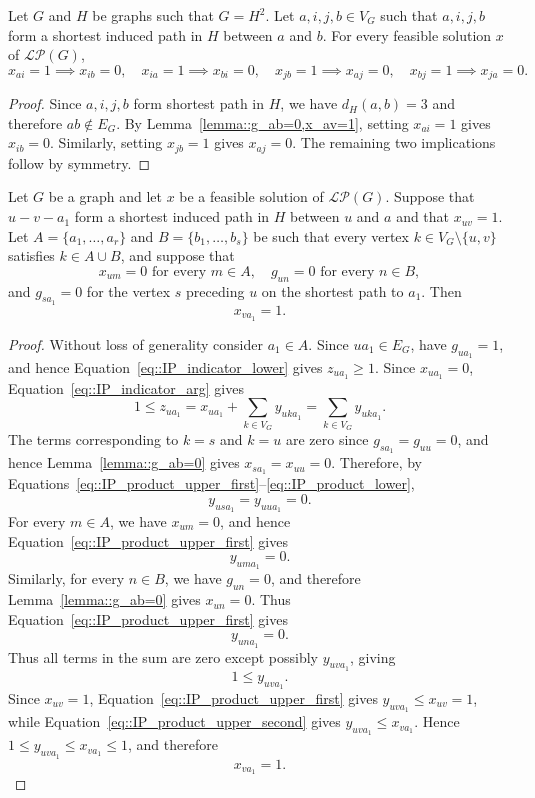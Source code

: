 \begin{lemma} \label{lemma::0_path_propagation}
  Let $G$ and $H$ be graphs such that $G = H^2$. Let $a,i,j,b \in V_G$ such that $a,i,j,b$ form a shortest induced path in $H$ between $a$ and $b$. For every feasible solution $x$ of $\mathcal{LP}(G)$,
  \[
  x_{ai}=1 \implies x_{ib}=0, \quad x_{ia}=1 \implies x_{bi}=0, \quad x_{jb}=1 \implies x_{aj}=0, \quad x_{bj}=1 \implies x_{ja}=0.
  \]
\end{lemma}
\begin{proof}
  Since $a,i,j,b$ form shortest path in $H$, we have $d_H(a,b)=3$ and therefore $ab \notin E_G$. By Lemma~\eqref{lemma::g_ab=0,x_av=1}, setting  $x_{ai}=1$ gives $x_{ib}=0.$ Similarly, setting $x_{jb}=1$ gives $ x_{aj}=0$. The remaining two implications follow by symmetry.
\end{proof}

\begin{lemma} \label{lemma::1_path_propagation}
  Let $G$ be a graph and let $x$ be a feasible solution of $\mathcal{LP}(G)$. Suppose that $u-v-a_1$ form a shortest induced path in $H$ between $u$ and $a$ and that $x_{uv}=1$. Let $A=\{a_1,\ldots,a_r\}$ and $B=\{b_1,\ldots,b_s\}$ be such that every vertex $k \in V_G\setminus\{u,v\}$ satisfies
  $k \in A\cup B$, and suppose that 
  \[
  x_{um}=0 \text{ for every } m \in A, \quad g_{un}=0 \text{ for every } n \in B,
  \]
  and $g_{sa_1}=0$ for the vertex $s$ preceding $u$ on the shortest path to $a_1$. Then
  \[
  x_{va_1}=1.
  \]
\end{lemma}
\begin{proof}
  Without loss of generality consider $a_1\in A$. Since $ua_1\in E_G$, have $g_{ua_1}=1$, and hence Equation~\eqref{eq::IP_indicator_lower} gives $z_{ua_1}\geq1$. Since $x_{ua_1}=0$, Equation~\eqref{eq::IP_indicator_arg} gives
  \[
  1 \leq z_{ua_1} = x_{ua_1}+\sum_{k\in V_G}y_{uka_1} = \sum_{k\in V_G}y_{uka_1}.
  \]
  The terms corresponding to $k=s$ and $k=u$ are zero since $g_{sa_1}=g_{uu}=0$, and hence Lemma~\eqref{lemma::g_ab=0} gives $x_{sa_1}=x_{uu}=0$. Therefore, by Equations~\eqref{eq::IP_product_upper_first}--\eqref{eq::IP_product_lower},
  \[
  y_{usa_1}=y_{uua_1}=0.
  \]
  For every $m\in A$, we have $x_{um}=0$, and hence Equation~\eqref{eq::IP_product_upper_first} gives
  \[
  y_{uma_1}=0.
  \]
  Similarly, for every $n\in B$, we have $g_{un}=0$, and therefore Lemma~\eqref{lemma::g_ab=0} gives $x_{un}=0$. Thus Equation~\eqref{eq::IP_product_upper_first} gives
  \[
  y_{una_1}=0.
  \]
  Thus all terms in the sum are zero except possibly $y_{uva_1}$, giving
  \[
  1 \leq y_{uva_1}.
  \]
  Since $x_{uv}=1$, Equation~\eqref{eq::IP_product_upper_first} gives $y_{uva_1}\leq x_{uv}=1$, while Equation~\eqref{eq::IP_product_upper_second} gives $y_{uva_1} \leq x_{va_1}$. Hence $1 \leq y_{uva_1} \leq x_{va_1} \leq 1$, and therefore
  \[
  x_{va_1}=1.
  \]
\end{proof}